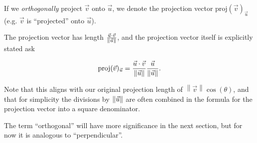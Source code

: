 \documentclass{ximera}
\begin{document}
    \begin{definition}
      If we \emph{orthogonally} project $\vec{v}$ onto $\vec{u}$, we denote the projection vector $\mbox{proj}(\vec{v})_{\vec{u}}$ (e.g. $\vec{v}$ is ``projected'' onto $\vec{u}$).
  
      
      The projection vector has length $\frac{\vec{u}\cdot\vec{v}}{\left\|\vec{u}\right\|}$, and the projection vector itself is explicitly stated ask

      $$\mbox{proj}(\vec{v})_{\vec{u}}=\frac{\vec{u}\cdot\vec{v}}{\left\|\vec{u}\right\|}\frac{\vec{u}}{\left\|\vec{u}\right\|}.$$


      Note that this aligns with our original projection length of $\left\|\vec{v}\right\|\cos(\theta)$, and that for simplicity the divisions by $\left\|\vec{u}\right\|$ are often combined in the formula for the projection vector into a square denominator.
    \end{definition}

    The term ``orthogonal'' will have more significance in the next section, but for now it is analogous to ``perpendicular''.
     
\end{document}
